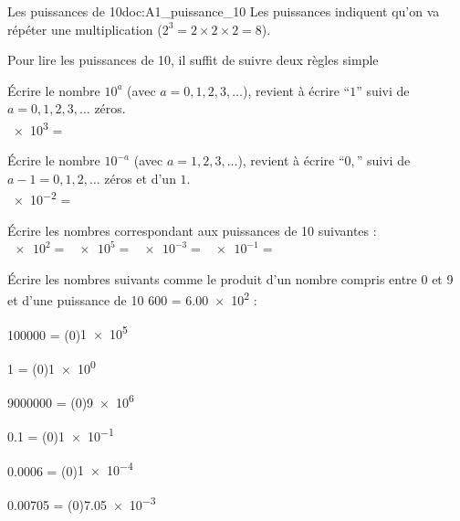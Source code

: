 \teteSndMeth

\vspace*{-36pt}


\vspace*{-20pt}

\begin{doc}{Les puissances de 10}{doc:A1_puissance_10}
  Les puissances indiquent qu'on va répéter une multiplication ($2^3 = 2 \times 2 \times 2 = 8$).
  
  Pour lire les puissances de 10, il suffit de suivre deux règles simple
  \begin{importants}
    \pointCyan Écrire le nombre $10^a$ (avec $a = 0, 1, 2, 3, \ldots$), revient à écrire ``$1$'' suivi de $a = 0, 1, 2, 3, \ldots$ zéros. \\
    \exemple \num{e3} = 

    \pointCyan Écrire le nombre $10^{-a}$ (avec $a = 1, 2, 3, \ldots$), revient à écrire ``$0,$'' suivi de $a - 1 = 0, 1, 2, \ldots$ zéros et d'un $1$. \\
    \exemple \num{e-2} = 
  \end{importants}
\end{doc}


\numeroQuestion Écrire les nombres correspondant aux puissances de 10 suivantes : \\
$\num{e2}  =$  \qq{}
$\num{e5}  =$  \qq{}
$\num{e-3} =$  \qq{}
$\num{e-1} =$ 

\numeroQuestion Écrire les nombres suivants comme le produit d'un nombre compris entre 0 et 9 et d'une puissance de 10 \exemple \num{600} = \num{6,00e2} :
\pasCorrection{\vspace*{-4pt}}
\begin{listePoints}[2]
  \setlength\itemsep{-4pt}
  \item \num{100000}  = \texteTrou(0){\num{1e5}}
  \item \num{1}       = \texteTrou(0){\num{1e0}}
  \item \num{9000000} = \texteTrou(0){\num{9e6}}
  \item \num{0,1}     = \texteTrou(0){\num{1e-1}}
  \item \num{0,0006}  = \texteTrou(0){\num{1e-4}}
  \item \num{0,00705} = \texteTrou(0){\num{7,05e-3}}
\end{listePoints}


